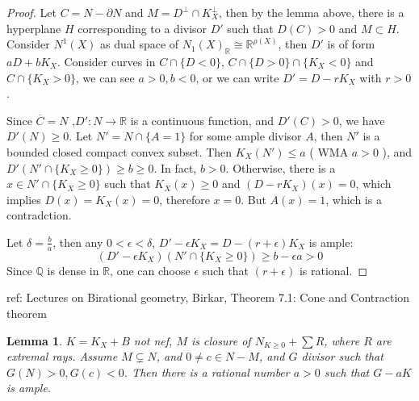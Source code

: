 \documentclass{article}
\newtheorem{lem}[defn]{Lemma}
\begin{document}
\begin{proof}
	Let $ C=N-\partial N $ and $ M= D^\perp\cap K_X^\perp $, then by the lemma above, there is a hyperplane $ H $ corresponding to a divisor $ D' $ such that $ D(C)>0 $ and $ M\subset H $. Consider $ N^1(X) $ as dual space of $ N_1(X)_\mathbb{R}\cong \mathbb{R}^{\rho(X)} $, then $ D' $ is of form $ aD+bK_X $. Consider curves in  $ C\cap\{ D<0\} $, $ C\cap \{D>0\}\cap \{K_X<0\} $ and $ C\cap \{K_X>0\} $, we can see $ a>0,b<0 $, or we can write $ D'=D-rK_X $ with $ r>0 $.
	
	Since $ \overline{C}=N $ ,$ D':N\to \mathbb{R} $ is a continuous function, and $ D'(C)>0 $, we have $ D'(N)\geqslant 0 $. Let $ N'=N\cap \{A=1\} $ for some ample divisor $ A $, then $ N' $ is a bounded closed compact convex subset. Then $ K_X(N')\leqslant a $ ( WMA $ a>0 $ ), and $ D'(N'\cap \{K_X\geqslant0 \})\geqslant b\geqslant 0 $. In fact, $ b>0 $. Otherwise, there is a $ x\in N'\cap \{ K_X\geqslant 0 \} $ such that $ K_X(x)\geqslant 0 $ and $ (D-rK_X)(x)=0 $, which implies $ D(x)=K_X(x)=0 $, therefore $ x=0 $. But $ A(x)=1 $, which is a contradction. 
	
	Let $ \delta=\frac{b}{a} $, then any $ 0<\epsilon <\delta $, $ D'-\epsilon K_X=D-(r+\epsilon)K_X $ is ample:
	$$ (D'-\epsilon K_X)(N'\cap \{K_X\geqslant 0\})\geqslant b-\epsilon a>0 $$
	Since $ \mathbb{Q} $ is dense in $ \mathbb{R} $, one can choose $ \epsilon $ such that $ (r+\epsilon) $ is rational. 
\end{proof}

ref: Lectures on Birational geometry, Birkar, Theorem 7.1: Cone and Contraction theorem

\begin{lem}
	$ K=K_X+B $ not nef, $ M $ is closure of $  N_{K\geqslant 0}+\sum R $, where $ R $ are extremal rays. Assume $ M\subsetneq N $, and $ 0\neq c\in N-M $, and $ G $ divisor such that $ G(N)>0,G(c)<0 $. Then there is a rational number $ a>0 $ such that $ G-aK $ is ample.
\end{lem}
\end{document}

